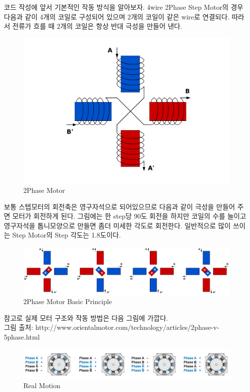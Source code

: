 \documentclass[11pt
  , a4paper
  , article
  , oneside
]{memoir}
\begin{document}
코드 작성에 앞서 기본적인 작동 방식을 알아보자. 
4wire 2Phase Step Motor의 경우 다음과 같이 4개의 코일로 구성되어 있으며 2개의 코일이 같은 wire로 연결되다.
따라서 전류가 흐를 때 2개의 코일은 항상 반대 극성을 만들어 낸다.
\begin{figure}[!htb]
\centering
\includegraphics[width=1\textwidth]{./images/raspberry/stepMotor4wire2phase1.png}
\caption{2Phase Motor}
\label{fig:2phase_principle1}
\end{figure}
보통 스텝모터의 회전축은 영구자석으로 되어있으므로 다음과 같이 극성을 만들어 주면 모터가 회전하게 된다. 
그림에는 한 step당 90도 회전을 하지만 코일의 수를 늘이고 영구자석을 톱니모양으로 만들면 좀더 미세한 
각도로 회전한다. 일반적으로 많이 쓰이는 Step Motor의 Step 각도는 1.8도이다.
\begin{figure}[!htb]
\centering
\includegraphics[width=1\textwidth]{./images/raspberry/stepMotor4wire2phase2.png}
\caption{2Phase Motor Basic Principle}
\label{fig:2phase_principle2}
\end{figure}
참고로 실제 모터 구조와 작동 방법은 다음 그림에 가깝다.\\
그림 출처: http://www.orientalmotor.com/technology/articles/2phase-v-5phase.html
\begin{figure}[!htb]
\centering
\includegraphics[width=1\textwidth]{./images/raspberry/2-ph-fullstep.jpg}
\caption{Real Motion}
\label{fig:2phase_principle3}
\end{figure}
\end{document}
